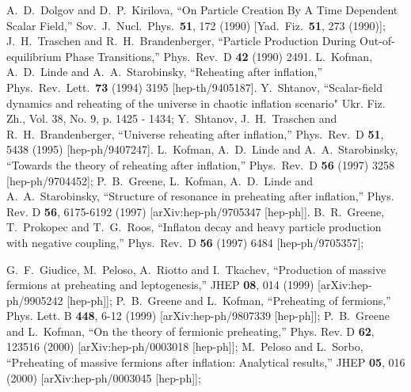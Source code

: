 \documentclass[%
aps,prd,nofootinbib,showkeys,a4paper,10pt
]{revtex4-2}
\begin{document}
\begin{thebibliography}{10}
A.~D.~Dolgov and D.~P.~Kirilova,
``On Particle Creation By A Time Dependent Scalar Field,''
Sov.\ J.\ Nucl.\ Phys.\  {\bf 51}, 172 (1990)
[Yad.\ Fiz.\  {\bf 51}, 273 (1990)];
J.~H.~Traschen and R.~H.~Brandenberger,
``Particle Production During Out-of-equilibrium Phase Transitions,''
Phys.\ Rev.\ D {\bf 42} (1990) 2491.
L.~Kofman, A.~D.~Linde and A.~A.~Starobinsky,
``Reheating after inflation,''
Phys.\ Rev.\ Lett.\  {\bf 73} (1994) 3195
[hep-th/9405187].
Y.~Shtanov,
``Scalar-field dynamics and reheating of the universe in chaotic inflation scenario"
Ukr. Fiz. Zh., Vol. 38, No. 9, p. 1425 - 1434;
Y.~Shtanov, J.~H.~Traschen and R.~H.~Brandenberger,
``Universe reheating after inflation,''
Phys.\ Rev.\ D {\bf 51}, 5438 (1995)
[hep-ph/9407247].
L.~Kofman, A.~D.~Linde and A.~A.~Starobinsky,
``Towards the theory of reheating after inflation,''
Phys.\ Rev.\ D {\bf 56} (1997) 3258
[hep-ph/9704452];
P.~B.~Greene, L.~Kofman, A.~D.~Linde and A.~A.~Starobinsky,
``Structure of resonance in preheating after inflation,''
Phys. Rev. D \textbf{56}, 6175-6192 (1997)
[arXiv:hep-ph/9705347 [hep-ph]].  
B.~R.~Greene, T.~Prokopec and T.~G.~Roos,
``Inflaton decay and heavy particle production with negative coupling,''
Phys.\ Rev.\ D {\bf 56} (1997) 6484
[hep-ph/9705357];
  
  
  
G.~F.~Giudice, M.~Peloso, A.~Riotto and I.~Tkachev,
``Production of massive fermions at preheating and leptogenesis,''
JHEP \textbf{08}, 014 (1999)
[arXiv:hep-ph/9905242 [hep-ph]];
P.~B.~Greene and L.~Kofman,
``Preheating of fermions,''
Phys. Lett. B \textbf{448}, 6-12 (1999)
[arXiv:hep-ph/9807339 [hep-ph]];
P.~B.~Greene and L.~Kofman,
``On the theory of fermionic preheating,''
Phys. Rev. D \textbf{62}, 123516 (2000)
[arXiv:hep-ph/0003018 [hep-ph]];
M.~Peloso and L.~Sorbo,
``Preheating of massive fermions after inflation: Analytical results,''
JHEP \textbf{05}, 016 (2000)
[arXiv:hep-ph/0003045 [hep-ph]];
  

\end{thebibliography}
\end{document}
